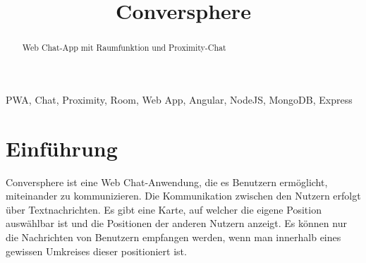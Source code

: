 \documentclass[conference]{IEEEtran}
\begin{document}
	\title{Conversphere}
	\author{
		\and
		\and
		\and
		\and
	}

	\maketitle

	\begin{abstract}
		Web Chat-App mit Raumfunktion und Proximity-Chat
	\end{abstract}

	\begin{IEEEkeywords}
		PWA, Chat, Proximity, Room, Web App, Angular, NodeJS, MongoDB, Express
	\end{IEEEkeywords}

	\section{Einführung}
	Conversphere ist eine Web Chat-Anwendung, die es Benutzern ermöglicht, miteinander zu kommunizieren. Die Kommunikation zwischen den Nutzern erfolgt über Textnachrichten. Es gibt eine Karte, auf welcher die eigene Position auswählbar ist und die Positionen der anderen Nutzern anzeigt. Es können nur die Nachrichten von Benutzern empfangen werden, wenn man innerhalb eines gewissen Umkreises dieser positioniert ist.
	
\end{document}
